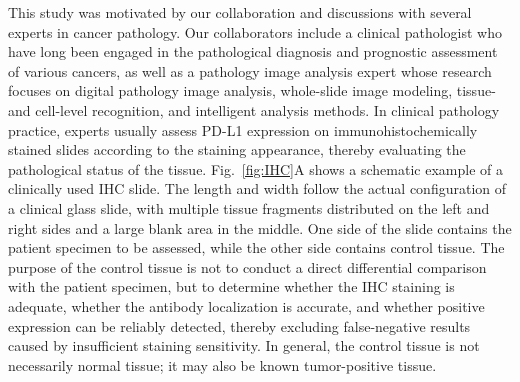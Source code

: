 \documentclass[journal]{vgtc}                     %
\begin{document}
This study was motivated by our collaboration and discussions with several experts in cancer pathology. Our collaborators include a clinical pathologist who have long been engaged in the pathological diagnosis and prognostic assessment of various cancers, as well as a pathology image analysis expert whose research focuses on digital pathology image analysis, whole-slide image modeling, tissue- and cell-level recognition, and intelligent analysis methods. In clinical pathology practice, experts usually assess PD-L1 expression on immunohistochemically stained slides according to the staining appearance, thereby evaluating the pathological status of the tissue. Fig.~\ref{fig:IHC}A shows a schematic example of a clinically used IHC slide. The length and width follow the actual configuration of a clinical glass slide, with multiple tissue fragments distributed on the left and right sides and a large blank area in the middle. One side of the slide contains the patient specimen to be assessed, while the other side contains control tissue. The purpose of the control tissue is not to conduct a direct differential comparison with the patient specimen, but to determine whether the IHC staining is adequate, whether the antibody localization is accurate, and whether positive expression can be reliably detected, thereby excluding false-negative results caused by insufficient staining sensitivity. In general, the control tissue is not necessarily normal tissue; it may also be known tumor-positive tissue.
\end{document}
